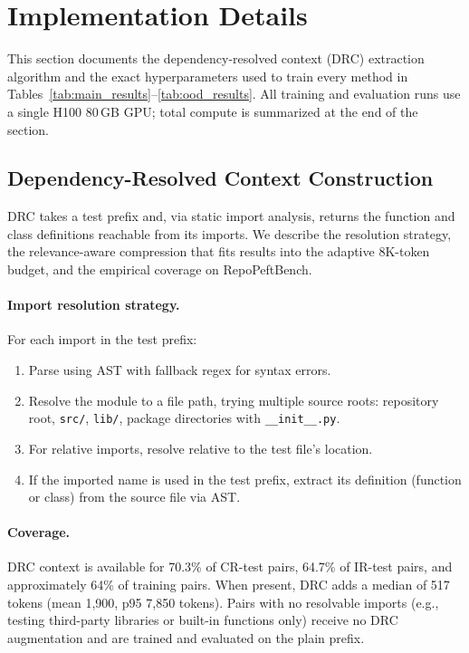 \documentclass{llmxive}
\providecommand{\repopeftbench}{RepoPeftBench\xspace}
\begin{document}
\section{Implementation Details}
\label{app:implementation}

This section documents the dependency-resolved context (DRC) extraction algorithm and the exact hyperparameters used to train every method in Tables~\ref{tab:main_results}--\ref{tab:ood_results}.
All training and evaluation runs use a single H100 80\,GB GPU; total compute is summarized at the end of the section.

\subsection{Dependency-Resolved Context Construction}
\label{app:drc_construction}

DRC takes a test prefix and, via static import analysis, returns the function and class definitions reachable from its imports.
We describe the resolution strategy, the relevance-aware compression that fits results into the adaptive 8K-token budget, and the empirical coverage on \repopeftbench{}.

\paragraph{Import resolution strategy.}
For each import in the test prefix:
\begin{enumerate}[nosep]
\item Parse using AST with fallback regex for syntax errors.
\item Resolve the module to a file path, trying multiple source roots: repository root, \texttt{src/}, \texttt{lib/}, package directories with \texttt{\_\_init\_\_.py}.
\item For relative imports, resolve relative to the test file's location.
\item If the imported name is used in the test prefix, extract its definition (function or class) from the source file via AST.
\end{enumerate}

\paragraph{Coverage.}
DRC context is available for 70.3\% of CR-test pairs, 64.7\% of IR-test pairs, and approximately 64\% of training pairs.
When present, DRC adds a median of 517 tokens (mean 1,900, p95 7,850 tokens).
Pairs with no resolvable imports (e.g., testing third-party libraries or built-in functions only) receive no DRC augmentation and are trained and evaluated on the plain prefix.
\end{document}
